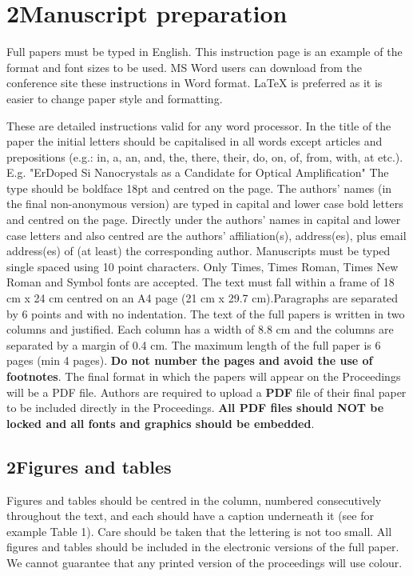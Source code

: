 \documentclass[10pt]{article}
\begin{document}
\section{2Manuscript preparation}
Full papers must be typed in English. This instruction page is
an example of the format and font sizes to be used. MS Word
users can download from the conference site these
instructions in Word format. LaTeX is preferred as it is easier to change paper style and formatting.

These are detailed instructions valid for any word
processor. In the title of the paper the initial letters should be
capitalised in all words except articles and prepositions (e.g.:
in, a, an, and, the, there, their, do, on, of, from, with, at etc.).
E.g. "ErDoped Si Nanocrystals as a Candidate for Optical
Amplification" The type should be boldface 18pt and centred
on the page. The authors' names (in the final non-anonymous version) are typed in capital and lower
case bold letters and centred on the page. Directly under the
authors' names in capital and lower case letters and also
centred are the authors' affiliation(s), address(es), plus email
address(es) of (at least) the corresponding author. Manuscripts must be
typed single spaced using 10 point characters. Only Times,
Times Roman, Times New Roman and Symbol fonts are
accepted. The text must fall within a frame of 18 cm x 24 cm
centred on an A4 page (21 cm x 29.7 cm).Paragraphs are
separated by 6 points and with no indentation. The text of the
full papers is written in two columns and justified. Each
column has a width of 8.8 cm and the columns are separated
by a margin of 0.4 cm. The maximum length of the full paper
is 6 pages (min 4 pages). \textbf{Do not number the pages and avoid the use of footnotes}. The final format in
which the papers will appear on the Proceedings will be a
PDF file. Authors are required to upload a \textbf{PDF} file of their
final paper to be included directly in the Proceedings. \textbf{All
PDF files should NOT be locked and all fonts and
graphics should be embedded}.

\subsection{2Figures and tables}
Figures and tables should be centred in the column, numbered
consecutively throughout the text, and each should have a
caption underneath it (see for example Table 1). Care should
be taken that the lettering is not too small. All figures and
tables should be included in the electronic versions of the full
paper. We cannot guarantee that any printed version of the
proceedings will use colour.
\end{document}
